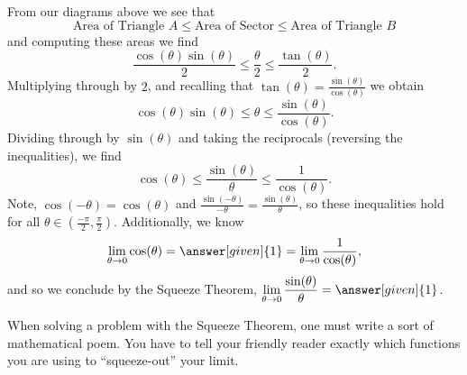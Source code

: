 \documentclass{ximera}
\begin{document}
\begin{example}
\begin{explanation}
From our diagrams above we see that
\[
\text{Area of Triangle $A$} \le \text{Area of Sector} \le \text{Area of Triangle $B$}
\]
and computing these areas we find
\[
\frac{\cos(\theta)\sin(\theta)}{2} \le \frac{\theta}{2} \le \frac{\tan(\theta)}{2}.
\]
Multiplying through by $2$, and recalling that $\tan(\theta) =
\frac{\sin(\theta)}{\cos(\theta)}$ we obtain
\[
\cos(\theta)\sin(\theta) \le \theta \le \frac{\sin(\theta)}{\cos(\theta)}.
\]
Dividing through by $\sin(\theta)$ and taking the reciprocals
(reversing the inequalities), we find
\[
\cos(\theta) \le \frac{\sin(\theta)}{\theta} \le \frac{1}{\cos(\theta)}.
\]
Note, $\cos(-\theta) = \cos(\theta)$ and $\frac{\sin(-\theta)}{-\theta} =
\frac{\sin(\theta)}{\theta}$, so these inequalities hold for all $\theta\in
\left(\frac{-\pi}{2}, \frac{\pi}{2}\right)$.  Additionally, we know
\[
\lim_{\theta \to 0}\cos(\theta) = \answer[given]{1} = \lim_{\theta\to 0}\frac{1}{\cos(\theta)},
\]
and so we conclude by the Squeeze Theorem, $\displaystyle\lim_{\theta \to
  0}\frac{\sin(\theta)}{\theta} = \answer[given]{1}$.
\end{explanation}
\end{example}

When solving a problem with the Squeeze Theorem, one must write a sort
of mathematical poem. You have to tell your friendly reader exactly
which functions you are using to ``squeeze-out'' your limit.
\end{document}
